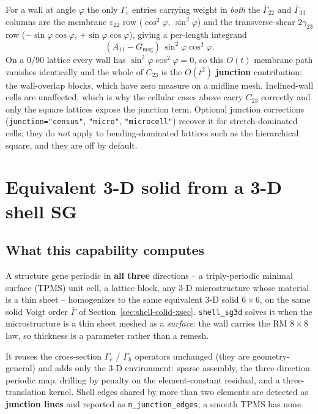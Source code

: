 For a wall at angle $\varphi$ the only $\Gamma_e$ entries carrying weight in
\emph{both} the $\bar\Gamma_{22}$ and $\bar\Gamma_{33}$ columns are the membrane
$\varepsilon_{22}$ row ($\cos^2\varphi$, $\sin^2\varphi$) and the
transverse-shear $2\gamma_{23}$ row ($-\sin\varphi\cos\varphi$,
$+\sin\varphi\cos\varphi$), giving a per-length integrand
\begin{equation}
(A_{11}-G_{\mathrm{msg}})\,\sin^2\varphi\cos^2\varphi .
\label{eq:shell-c23}
\end{equation}
On a $0/90$ lattice every wall has $\sin^2\varphi\cos^2\varphi = 0$, so this
$O(t)$ membrane path vanishes identically and the whole of $C_{23}$ is the
$O(t^2)$ \textbf{junction} contribution: the wall-overlap blocks, which have zero
measure on a midline mesh. Inclined-wall cells are unaffected, which is why the
cellular cases above carry $C_{23}$ correctly and only the square lattices expose
the junction term. Optional junction corrections (\texttt{junction="census"},
\texttt{"micro"}, \texttt{"microcell"}) recover it for stretch-dominated cells;
they do \emph{not} apply to bending-dominated lattices such as the hierarchical
square, and they are off by default.

\section{Equivalent 3-D solid from a 3-D shell SG}
\label{sec:shell-sg3d}

\subsection{What this capability computes}

A structure gene periodic in \textbf{all three} directions -- a triply-periodic
minimal surface (TPMS) unit cell, a lattice block, any 3-D microstructure whose
material is a thin sheet -- homogenizes to the same equivalent 3-D solid
$6\times6$, on the same solid Voigt order $\bar{\Gamma}$ of
Section~\ref{sec:shell-solid-xsec}. \texttt{shell\_sg3d} solves it when the
microstructure is a thin sheet meshed as a \emph{surface}: the wall carries the
RM $8\times8$ law, so thickness is a parameter rather than a remesh.

It reuses the cross-section $\Gamma_e$ / $\Gamma_h$ operators unchanged (they are
geometry-general) and adds only the 3-D environment: sparse assembly, the
three-direction periodic map, drilling by penalty on the element-constant
residual, and a three-translation kernel. Shell edges shared by more than two
elements are detected as \textbf{junction lines} and reported as
\texttt{n\_junction\_edges}; a smooth TPMS has none.

